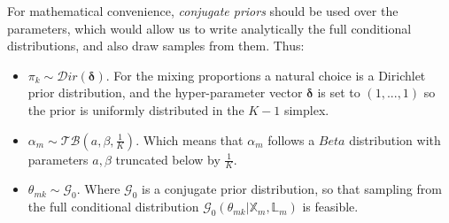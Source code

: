 For mathematical convenience, \emph{conjugate priors} should be used over the parameters, which would allow us to write analytically the full conditional distributions, and also draw samples from them. Thus:
\begin{itemize}
	\item $\pi_{k} \sim \mathcal{D}ir(\mathbf{\delta})$. For the mixing proportions a natural choice is a Dirichlet prior distribution, and the hyper-parameter vector $\mathbf{\delta}$ is set to $(1,...,1)$ so the prior is uniformly distributed in the $K-1$ simplex.
	\item $\alpha_{m} \sim \mathcal{TB}(\mathit{a}, \beta, \frac{1}{K})$. Which means that $\alpha_{m}$ follows a $Beta$ distribution with parameters $\mathit{a}, \beta$ truncated below by $\frac{1}{K}$.
	\item $\theta_{mk} \sim \mathcal{G}_{0}$. Where $\mathcal{G}_{0}$ is a conjugate prior distribution, so that sampling from the full conditional distribution $\mathcal{G}_{0}(\theta_{mk}|\mathbb{X}_{m}, \mathbb{L}_{m})$ is feasible.
\end{itemize}

